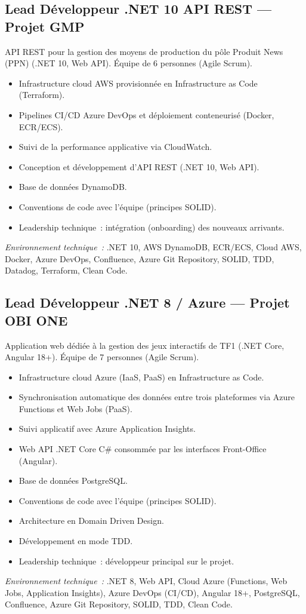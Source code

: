 \documentclass[10pt,a4paper]{article}
\begin{document}
\subsection*{Lead Développeur .NET 10 API REST --- Projet GMP}
\color{darkgray}
API REST pour la gestion des moyens de production du pôle Produit News (PPN) (.NET 10, Web API). Équipe de 6 personnes (Agile Scrum).
\begin{itemize}
  \item Infrastructure cloud AWS provisionnée en Infrastructure as Code (Terraform).
  \item Pipelines CI/CD Azure DevOps et déploiement conteneurisé (Docker, ECR/ECS).
  \item Suivi de la performance applicative via CloudWatch.
  \item Conception et développement d'API REST (.NET 10, Web API).
  \item Base de données DynamoDB.
  \item Conventions de code avec l'équipe (principes SOLID).
  \item Leadership technique~: intégration (onboarding) des nouveaux arrivants.
\end{itemize}
\textit{Environnement technique~:} .NET 10, AWS DynamoDB, ECR/ECS, Cloud AWS, Docker, Azure DevOps, Confluence, Azure Git Repository, SOLID, TDD, Datadog, Terraform, Clean Code.

\vspace{6pt}

\subsection*{Lead Développeur .NET 8 / Azure --- Projet OBI ONE}
\color{darkgray}
Application web dédiée à la gestion des jeux interactifs de TF1 (.NET Core, Angular 18+). Équipe de 7 personnes (Agile Scrum).
\begin{itemize}
  \item Infrastructure cloud Azure (IaaS, PaaS) en Infrastructure as Code.
  \item Synchronisation automatique des données entre trois plateformes via Azure Functions et Web Jobs (PaaS).
  \item Suivi applicatif avec Azure Application Insights.
  \item Web API .NET Core C\# consommée par les interfaces Front-Office (Angular).
  \item Base de données PostgreSQL.
  \item Conventions de code avec l'équipe (principes SOLID).
  \item Architecture en Domain Driven Design.
  \item Développement en mode TDD.
  \item Leadership technique~: développeur principal sur le projet.
\end{itemize}
\textit{Environnement technique~:} .NET 8, Web API, Cloud Azure (Functions, Web Jobs, Application Insights), Azure DevOps (CI/CD), Angular 18+, PostgreSQL, Confluence, Azure Git Repository, SOLID, TDD, Clean Code.
\end{document}
